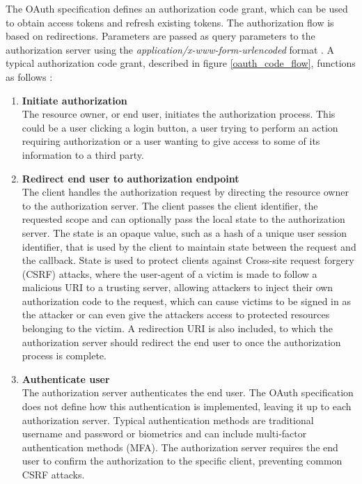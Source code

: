 The OAuth specification defines an authorization code grant, which can be used to obtain access tokens and refresh existing tokens.  
The authorization flow is based on redirections.  Parameters are passed as query parameters to the authorization server using the \textit{application/x-www-form-urlencoded} format \citep{noauthor_post_2023}.
A typical authorization code grant, described in figure \ref{oauth_code_flow}, functions as follows
\citep{hardt_oauth_2012}:
\begin{enumerate}
    \item \textbf{Initiate authorization} \\
    The resource owner, or end user, initiates the authorization process.
    This could be a user clicking a login button, a user trying to perform an action requiring authorization or a user wanting to give access to some of its information to a third party.
    \item \textbf{Redirect end user to authorization endpoint} \\
    The client handles the authorization request by directing the resource owner to the authorization server.
    The client passes the client identifier, the requested scope and can optionally pass the local state to the authorization server.
    The state is an opaque value, such as a hash of a unique user session identifier, that is used by the client to maintain state between the request and the callback.
    State is used to protect clients against Cross-site request forgery (CSRF) attacks, where the user-agent of a victim is made to follow a malicious URI to a trusting server, allowing attackers to inject their own authorization code to the request, which can cause victims to be signed in as the attacker or can even give the attackers access to protected resources belonging to the victim. 
    A redirection URI is also included, to which the authorization server should redirect the end user to once the authorization process is complete.
    \item \textbf{Authenticate user} \\
    The authorization server authenticates the end user.
    The OAuth specification does not define how this authentication is implemented, leaving it up to each authorization server.
    Typical authentication methods are traditional username and password or biometrics and can include multi-factor authentication methods (MFA).
    The authorization server requires the end user to confirm the authorization to the specific client, preventing common CSRF attacks.

\end{enumerate}
